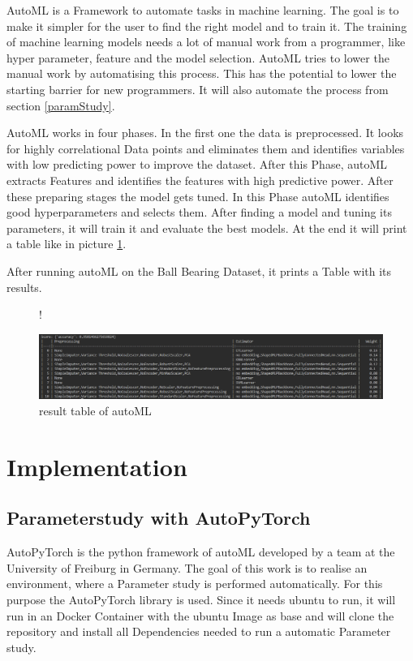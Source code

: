 \documentclass[a4paper, 12pt, oneside]{scrbook}
\begin{document}
			\noindent AutoML is a Framework to automate tasks in machine learning. The goal is to make it simpler for the user to find the right model and to train it. The training of machine learning models needs a lot of manual work from a programmer, like hyper parameter, feature and the model selection. AutoML tries to lower the manual work by automatising this process. This has the potential to lower the starting barrier for new programmers. It will also automate the process from section \ref{paramStudy}. 
			
			AutoML works in four phases. In the first one the data is preprocessed. It looks for highly correlational Data points and eliminates them and identifies variables with low predicting power to improve the dataset. After this Phase, autoML extracts Features and identifies the features with high predictive power. After these preparing stages the model gets tuned. In this Phase autoML identifies good hyperparameters and selects them. After finding a model and tuning its parameters, it will train it and evaluate the best models. At the end it will print a table like in picture \ref{fig:autoML_Table}.
			
			After running autoML on the Ball Bearing Dataset, it prints a Table with its results. 
			
			\begin{figure} [H]
				\centering
				\resizebox{\linewidth} {!} {
					\includegraphics{res/autoML.png}
					
				}
				\caption{result table of autoML}
				\label{fig:autoML_Table}
			\end{figure}
			
			
			
	 
	 
	\chapter{Implementation}
		
		\section{Parameterstudy with AutoPyTorch}
		
		\noindent AutoPyTorch is the python framework of autoML developed by a team at the University of Freiburg in Germany. The goal of this work is to realise an environment, where a Parameter study is performed automatically. For this purpose the AutoPyTorch library is used. Since it needs ubuntu to run, it will run in an Docker Container with the ubuntu Image as base and will clone the repository and install all Dependencies needed to run a automatic Parameter study.
		
\end{document}
